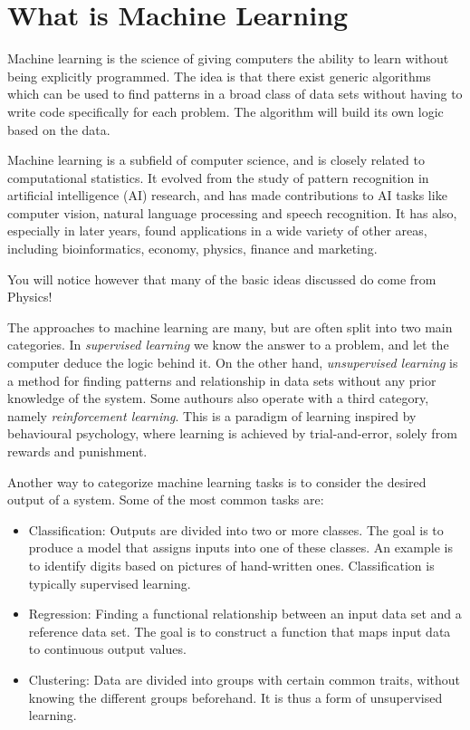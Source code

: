 \documentclass[aip,jcp,reprint,floatfix]{revtex4-1}
\begin{document}
\section{What is Machine Learning}
Machine learning is the science of giving computers the ability to
learn without being explicitly programmed.  The idea is that there
exist generic algorithms which can be used to find patterns in a broad
class of data sets without having to write code specifically for each
problem. The algorithm will build its own logic based on the data.

Machine learning is a subfield of computer science, and is closely
related to computational statistics.  It evolved from the study of
pattern recognition in artificial intelligence (AI) research, and has
made contributions to AI tasks like computer vision, natural language
processing and speech recognition. It has also, especially in later
years, found applications in a wide variety of other areas, including
bioinformatics, economy, physics, finance and marketing.

You will notice however that many of the basic ideas discussed do come from Physics!

The approaches to machine learning are many, but are often split into two main categories. 
In \emph{supervised learning} we know the answer to a problem,
and let the computer deduce the logic behind it. On the other hand, \emph{unsupervised learning}
is a method for finding patterns and relationship in data sets without any prior knowledge of the system.
Some authours also operate with a third category, namely \emph{reinforcement learning}. This is a paradigm 
of learning inspired by behavioural psychology, where learning is achieved by trial-and-error, 
solely from rewards and punishment.

Another way to categorize machine learning tasks is to consider the desired output of a system.
Some of the most common tasks are:

\begin{itemize}
  \item Classification: Outputs are divided into two or more classes. The goal is to   produce a model that assigns inputs into one of these classes. An example is to identify  digits based on pictures of hand-written ones. Classification is typically supervised learning.

  \item Regression: Finding a functional relationship between an input data set and a reference data set.   The goal is to construct a function that maps input data to continuous output values.

  \item Clustering: Data are divided into groups with certain common traits, without knowing the different groups beforehand.  It is thus a form of unsupervised learning.
\end{itemize}
\end{document}
